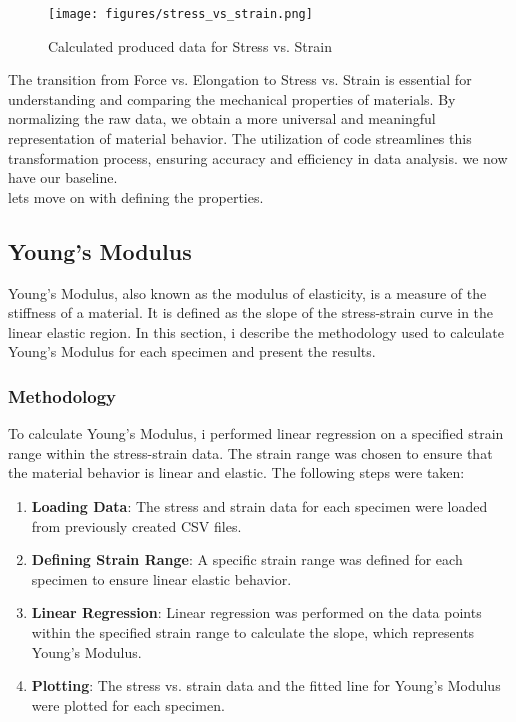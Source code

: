 \documentclass{article}
\begin{document}
 \begin{figure}[H]
     \centering
     \texttt{[image: figures/stress\_vs\_strain.png]}
     \caption{Calculated produced data for Stress vs. Strain}
     \label{fig:stress_strain}
 \end{figure} 
 The transition from Force vs. Elongation to Stress vs. Strain is essential for understanding and comparing the mechanical properties of materials. By normalizing the raw data, we obtain a more universal and meaningful representation of material behavior. The utilization of code streamlines this transformation process, ensuring accuracy and efficiency in data analysis.
    we now have our baseline.\\
    lets move on with defining the properties.
   \newpage
\subsection{Young's Modulus}

Young's Modulus, also known as the modulus of elasticity, is a measure of the stiffness of a material. It is defined as the slope of the stress-strain curve in the linear elastic region. In this section, i describe the methodology used to calculate Young's Modulus for each specimen and present the results.

\subsubsection{Methodology}

To calculate Young's Modulus, i performed linear regression on a specified strain range within the stress-strain data. The strain range was chosen to ensure that the material behavior is linear and elastic. The following steps were taken:

\begin{enumerate}
    \item \textbf{Loading Data}: The stress and strain data for each specimen were loaded from previously created CSV files.
    \item \textbf{Defining Strain Range}: A specific strain range was defined for each specimen to ensure linear elastic behavior.
    \item \textbf{Linear Regression}\footnotemark: Linear regression was performed on the data points within the specified strain range to calculate the slope, which represents Young's Modulus.
    \item \textbf{Plotting}: The stress vs. strain data and the fitted line for Young's Modulus were plotted for each specimen.
\end{enumerate}
\newpage
\end{document}
